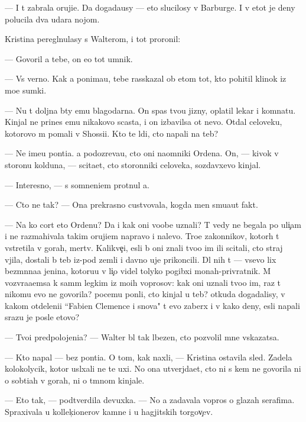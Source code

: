 \documentclass[10pt]{book}
\begin{document}
— I t{\yi} zabrala oruji{\y}e. Da{\y} dogada{\y}usy — eto slucilosy v Barburge. I v etot je deny polucila dva udara nojom.

Kristina peregl{\ia}nulasy s Walterom, i tot proronil:

— Govoril {\y}a tebe, on {\y}e{\x}o tot umnik.

— Vs{\e} verno. Kak {\y}a ponima{\y}u, tebe rasskazal ob etom tot, kto pohitil klinok iz mo{\y}e{\y} sumki.

— Nu t{\yi} doljna b{\yi}ty {\y}emu blagodarna. On spas tvo{\y}u jizny, oplatil lekar{\ia} i komnatu. Kinjal ne prines {\y}emu nikakovo scast{\y}a, i on izbavilsa ot nevo. Otdal celoveku, kotorovo m{\yi} po{\y}mali v Shossi{\y}i. Kto te l{\iu}di, cto napali na teb{\ia}?

— Ne ime{\y}u pon{\ia}ti{\y}a. {\Y}a podozreva{\y}u, cto oni na{\y}omniki Ordena. On, — kivok v storonu kolduna, — scita{\y}et, cto storonniki celoveka, sozdavxevo kinjal.

— Interesno, — s somneni{\y}em prot{\ia}nul {\y}a.

— Cto ne tak? — Ona prekrasno custvovala, kogda men{\ia} smu{\x}a{\y}ut fakt{\yi}.

— Na ko{\y} cort eto Ordenu? Da i kak oni voob{\x}e uznali? T{\yi} vedy ne begala po uli{\c}am i ne razmahivala takim oruji{\y}em napravo i nalevo. Tro{\y}e zakonnikov, kotor{\yi}h t{\yi} vstretila v gorah, mertv{\yi}. Kalikve{\c}i, {\y}esli b{\yi} oni znali tvo{\y}o im{\ia} ili scitali, cto straj v{\yi}jila, dostali b{\yi} teb{\ia} iz-pod zemli i davno uje prikoncili. Dl{\ia} nih t{\yi} — vsevo lix bez{\yi}m{\ia}nna{\y}a jen{\x}ina, kotoru{\y}u v li{\c}o videl tolyko pogibxi{\y} monah-privratnik. M{\yi} vozvra{\x}a{\y}emsa k sam{\yi}m legkim iz mo{\y}ih voprosov: kak oni uznali tvo{\y}o im{\ia}, raz t{\yi} nikomu {\y}evo ne govorila? pocemu pon{\ia}li, cto kinjal u teb{\ia}? otkuda dogadalisy, v kakom otdeleni{\y}i ``Fabien Clemence i s{\yi}nov{\y}a" t{\yi} {\y}evo zaber{\e}x i v kako{\y} deny, {\y}esli napali srazu je posle etovo?

— Tvo{\y}i predpolojeni{\y}a? — Walter b{\yi}l tak l{\iu}bezen, cto pozvolil mne v{\yi}skazatsa.

— Kto napal — bez pon{\ia}ti{\y}a. O tom, kak naxli, — Kristina ostavila sled{\yi}. Zadela kolokolycik, kotor{\yi}{\y} usl{\yi}xali ne te uxi. No ona utverjda{\y}et, cto ni s kem ne govorila ni o sob{\yi}ti{\y}ah v gorah, ni o t{\e}mnom kinjale.

— Eto tak, — podtverdila devuxka. — No {\y}a zadavala vopros{\yi} o glazah serafima. Spraxivala u kollek{\c}ionerov kamne{\y} i u hagjitskih torgov{\c}ev.
\end{document}
